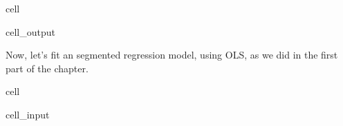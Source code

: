 \documentclass[letterpaper,10pt,english]{jupyterBook}
\begin{document}
\begin{sphinxuseclass}{cell}
\begin{sphinxVerbatimOutput}
\begin{sphinxuseclass}{cell_output}
\begin{sphinxVerbatim}
\end{sphinxVerbatim}

\end{sphinxuseclass}\end{sphinxVerbatimOutput}

\end{sphinxuseclass}
\sphinxAtStartPar
Now, let’s fit an segmented regression model, using OLS, as we did in the first part of the chapter.

\begin{sphinxuseclass}{cell}\begin{sphinxVerbatimInput}

\begin{sphinxuseclass}{cell_input}
\begin{sphinxVerbatim}[commandchars=\\\{\}]
  \PYG{p}{[}\PYG{p}{[} \PYG{p}{]}\PYG{p}{]}
  \PYG{p}{[}\PYG{p}{]}

   
\end{sphinxVerbatim}

\end{sphinxuseclass}\end{sphinxVerbatimInput}
\begin{sphinxVerbatimOutput}


\end{sphinxVerbatimOutput}
\end{sphinxuseclass}
\end{document}
